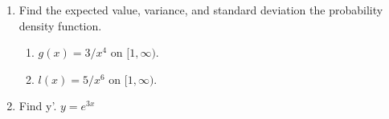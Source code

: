 \documentclass[letterpaper]{article}
\begin{document}
\begin{enumerate}

\item Find the expected value, variance, and standard deviation the probability density function.
	\begin{enumerate}

	\item $g(x)=3/x^4$ on $[1,\infty)$.

	\item $l(x)=5/x^6$ on $[1,\infty)$.
	\end{enumerate}


\item Find y'.
	$y=e^{3x}$

\end{enumerate}
\end{document}
